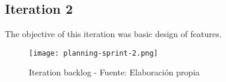\subsection{Iteration 2}
The objective of this iteration was basic design of features.

\begin{figure}[H]
    \centering
    \texttt{[image: planning-sprint-2.png]}
    \caption{Iteration backlog - Fuente: Elaboración propia}
    \label{fig:sprint2-backlog}
\end{figure}
